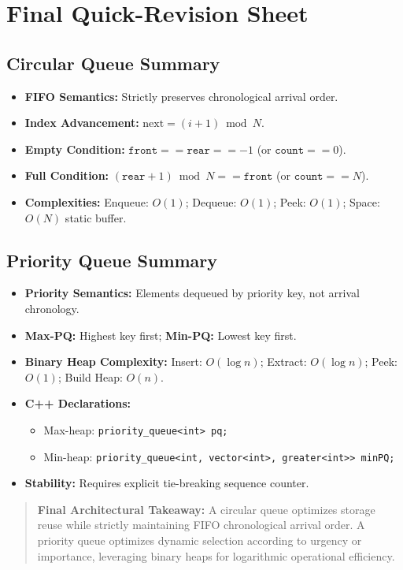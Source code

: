 \section{Final Quick-Revision Sheet}

\subsection{Circular Queue Summary}
\begin{itemize}
    \item \textbf{FIFO Semantics:} Strictly preserves chronological arrival order.
    \item \textbf{Index Advancement:} $\text{next} = (i + 1) \bmod N$.
    \item \textbf{Empty Condition:} $\texttt{front} == \texttt{rear} == -1$ (or $\texttt{count} == 0$).
    \item \textbf{Full Condition:} $(\texttt{rear} + 1) \bmod N == \texttt{front}$ (or $\texttt{count} == N$).
    \item \textbf{Complexities:} Enqueue: $O(1)$; Dequeue: $O(1)$; Peek: $O(1)$; Space: $O(N)$ static buffer.
\end{itemize}

\subsection{Priority Queue Summary}
\begin{itemize}
    \item \textbf{Priority Semantics:} Elements dequeued by priority key, not arrival chronology.
    \item \textbf{Max-PQ:} Highest key first; \textbf{Min-PQ:} Lowest key first.
    \item \textbf{Binary Heap Complexity:} Insert: $O(\log n)$; Extract: $O(\log n)$; Peek: $O(1)$; Build Heap: $O(n)$.
    \item \textbf{C++ Declarations:}
    \begin{itemize}
        \item Max-heap: \texttt{priority\_queue<int> pq;}
        \item Min-heap: \texttt{priority\_queue<int, vector<int>, greater<int>> minPQ;}
    \end{itemize}
    \item \textbf{Stability:} Requires explicit tie-breaking sequence counter.
\end{itemize}

\begin{quote}
\textbf{Final Architectural Takeaway:} A circular queue optimizes storage reuse while strictly maintaining FIFO chronological arrival order. A priority queue optimizes dynamic selection according to urgency or importance, leveraging binary heaps for logarithmic operational efficiency.
\end{quote}
